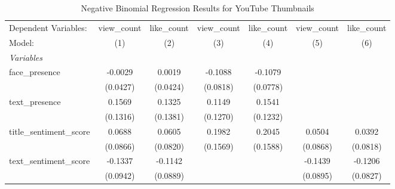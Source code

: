 
\begin{table}[htbp]
   \caption{Negative Binomial Regression Results for YouTube Thumbnails}
   \centering
   \begin{tabular}{lcccccc}
      \tabularnewline \midrule \midrule
      Dependent Variables:           & view\_count             & like\_count             & view\_count                  & like\_count                 & view\_count             & like\_count\\   
      Model:                         & (1)                     & (2)                     & (3)                          & (4)                         & (5)                     & (6)\\  
      \midrule
      \emph{Variables}\\
      face\_presence                 & -0.0029                 & 0.0019                  & -0.1088                      & -0.1079                     &                         &   \\   
                                     & (0.0427)                & (0.0424)                & (0.0818)                     & (0.0778)                    &                         &   \\   
      text\_presence                 & 0.1569                  & 0.1325                  & 0.1149                       & 0.1541                      &                         &   \\   
                                     & (0.1316)                & (0.1381)                & (0.1270)                     & (0.1232)                    &                         &   \\   
      title\_sentiment\_score        & 0.0688                  & 0.0605                  & 0.1982                       & 0.2045                      & 0.0504                  & 0.0392\\   
                                     & (0.0866)                & (0.0820)                & (0.1569)                     & (0.1588)                    & (0.0868)                & (0.0818)\\   
      text\_sentiment\_score         & -0.1337                 & -0.1142                 &                              &                             & -0.1439                 & -0.1206\\   
                                     & (0.0942)                & (0.0889)                &                              &                             & (0.0895)                & (0.0827)\\   

\end{tabular}
\end{table}
